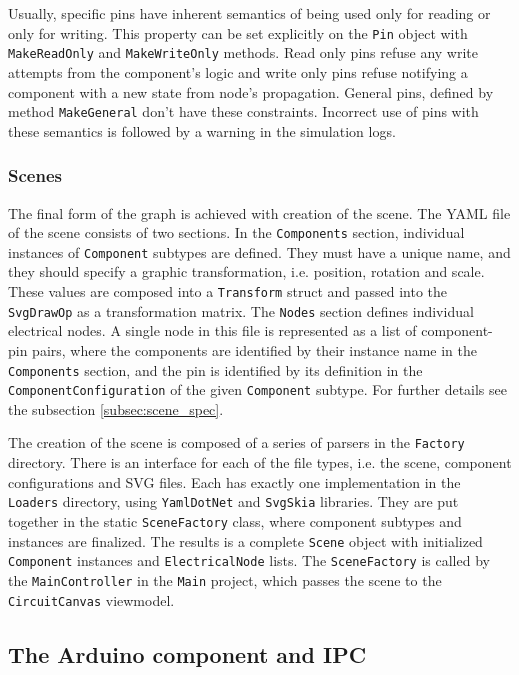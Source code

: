 Usually, specific pins have inherent semantics of being used only for reading or only for writing. This property can be set explicitly on the \texttt{Pin} object with \texttt{MakeReadOnly} and \texttt{MakeWriteOnly} methods. Read only pins refuse any write attempts from the component's logic and write only pins refuse notifying a component with a new state from node's propagation. General pins, defined by method \texttt{MakeGeneral} don't have these constraints. Incorrect use of pins with these semantics is followed by a warning in the simulation logs.

\subsubsection{Scenes}

The final form of the graph is achieved with creation of the scene. The YAML file of the scene consists of two sections. In the \texttt{Components} section, individual instances of \texttt{Component} subtypes are defined. They must have a unique name, and they should specify a graphic transformation, i.e. position, rotation and scale. These values are composed into a \texttt{Transform} struct and passed into the \texttt{SvgDrawOp} as a transformation matrix. The \texttt{Nodes} section defines individual electrical nodes. A single node in this file is represented as a list of component-pin pairs, where the components are identified by their instance name in the \texttt{Components} section, and the pin is identified by its definition in the \texttt{ComponentConfiguration} of the given \texttt{Component} subtype. For further details see the subsection \ref{subsec:scene_spec}.

The creation of the scene is composed of a series of parsers in the \texttt{Factory} directory. There is an interface for each of the file types, i.e. the scene, component configurations and SVG files. Each has exactly one implementation in the \texttt{Loaders} directory, using \texttt{YamlDotNet} and \texttt{SvgSkia} libraries. They are put together in the static \texttt{SceneFactory} class, where component subtypes and instances are finalized. The results is a complete \texttt{Scene} object with initialized \texttt{Component} instances and \texttt{ElectricalNode} lists. The \texttt{SceneFactory} is called by the \texttt{MainController} in the \texttt{Main} project, which passes the scene to the \texttt{CircuitCanvas} viewmodel.

\subsection{The Arduino component and IPC}

